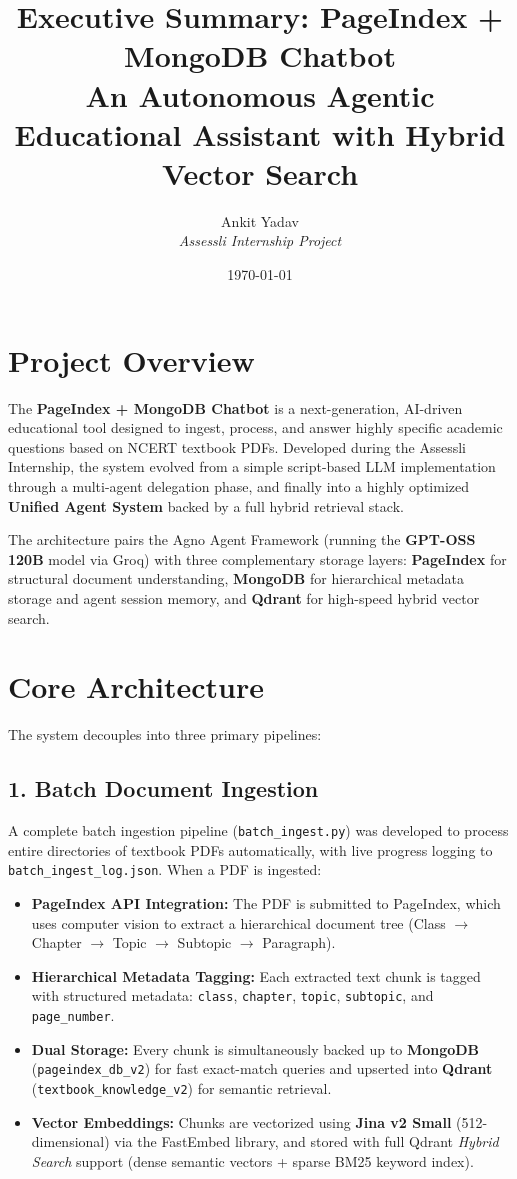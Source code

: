 \documentclass[12pt, a4paper]{article}
\title{\textbf{Executive Summary: PageIndex + MongoDB Chatbot}\\ \large An Autonomous Agentic Educational Assistant with Hybrid Vector Search}
\author{Ankit Yadav \\ \textit{Assessli Internship Project}}
\date{\today}
\begin{document}
\maketitle

\section{Project Overview}
The \textbf{PageIndex + MongoDB Chatbot} is a next-generation, AI-driven educational tool designed to ingest, process, and answer highly specific academic questions based on NCERT textbook PDFs. Developed during the Assessli Internship, the system evolved from a simple script-based LLM implementation through a multi-agent delegation phase, and finally into a highly optimized \textbf{Unified Agent System} backed by a full hybrid retrieval stack.

The architecture pairs the Agno Agent Framework (running the \textbf{GPT-OSS 120B} model via Groq) with three complementary storage layers: \textbf{PageIndex} for structural document understanding, \textbf{MongoDB} for hierarchical metadata storage and agent session memory, and \textbf{Qdrant} for high-speed hybrid vector search.

\section{Core Architecture}
The system decouples into three primary pipelines:

\subsection{1. Batch Document Ingestion}
A complete batch ingestion pipeline (\texttt{batch\_ingest.py}) was developed to process entire directories of textbook PDFs automatically, with live progress logging to \texttt{batch\_ingest\_log.json}. When a PDF is ingested:
\begin{itemize}[label=\(\bullet\)]
    \item \textbf{PageIndex API Integration:} The PDF is submitted to PageIndex, which uses computer vision to extract a hierarchical document tree (Class $\rightarrow$ Chapter $\rightarrow$ Topic $\rightarrow$ Subtopic $\rightarrow$ Paragraph).
    \item \textbf{Hierarchical Metadata Tagging:} Each extracted text chunk is tagged with structured metadata: \texttt{class}, \texttt{chapter}, \texttt{topic}, \texttt{subtopic}, and \texttt{page\_number}.
    \item \textbf{Dual Storage:} Every chunk is simultaneously backed up to \textbf{MongoDB} (\texttt{pageindex\_db\_v2}) for fast exact-match queries and upserted into \textbf{Qdrant} (\texttt{textbook\_knowledge\_v2}) for semantic retrieval.
    \item \textbf{Vector Embeddings:} Chunks are vectorized using \textbf{Jina v2 Small} (512-dimensional) via the FastEmbed library, and stored with full Qdrant \textit{Hybrid Search} support (dense semantic vectors + sparse BM25 keyword index).
\end{itemize}
\end{document}
